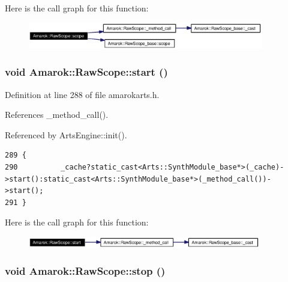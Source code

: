 Here is the call graph for this function:\begin{figure}[H]
\begin{center}
\leavevmode
\includegraphics[width=291pt]{classAmarok_1_1RawScope_Amarok_1_1RawScopea18_cgraph}
\end{center}
\end{figure}
\subsubsection{\setlength{\rightskip}{0pt plus 5cm}void Amarok::Raw\-Scope::start ()\hspace{0.3cm}{\tt  [inline]}}\label{classAmarok_1_1RawScope_Amarok_1_1RawScopea11}




Definition at line 288 of file amarokarts.h.

References \_\-method\_\-call().

Referenced by Arts\-Engine::init().



\footnotesize\begin{verbatim}289 {
290          _cache?static_cast<Arts::SynthModule_base*>(_cache)->start():static_cast<Arts::SynthModule_base*>(_method_call())->start();
291 }
\end{verbatim}\normalsize 


Here is the call graph for this function:\begin{figure}[H]
\begin{center}
\leavevmode
\includegraphics[width=288pt]{classAmarok_1_1RawScope_Amarok_1_1RawScopea11_cgraph}
\end{center}
\end{figure}
\subsubsection{\setlength{\rightskip}{0pt plus 5cm}void Amarok::Raw\-Scope::stop ()\hspace{0.3cm}{\tt  [inline]}}\label{classAmarok_1_1RawScope_Amarok_1_1RawScopea12}




